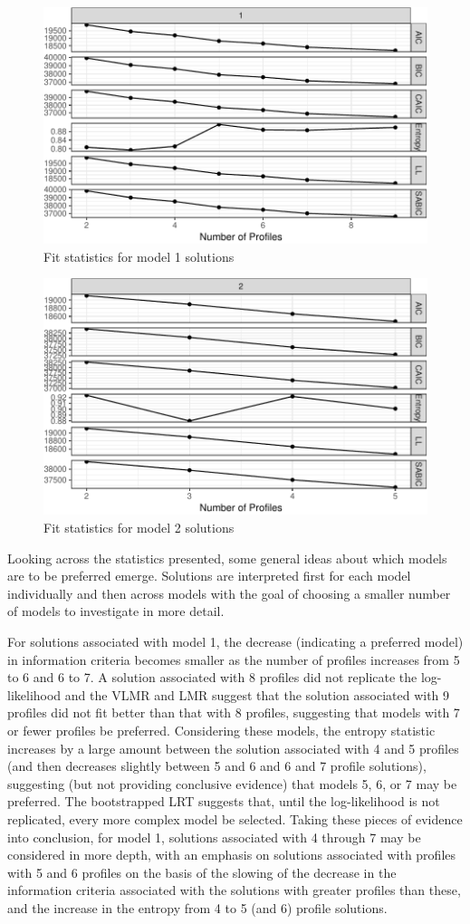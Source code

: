 \documentclass[]{book}
\theoremstyle{definition}
\theoremstyle{definition}
\theoremstyle{definition}
\theoremstyle{remark}
\begin{document}
\begin{figure}

{\centering \includegraphics[width=0.5\linewidth]{rosenberg-dissertation_files/figure-latex/model1-1} 

}

\caption{Fit statistics for model 1 solutions}\label{fig:model1}
\end{figure}

\begin{figure}

{\centering \includegraphics[width=0.4\linewidth]{rosenberg-dissertation_files/figure-latex/model2-1} 

}

\caption{Fit statistics for model 2 solutions}\label{fig:model2}
\end{figure}

Looking across the statistics presented, some general ideas about which
models are to be preferred emerge. Solutions are interpreted first for
each model individually and then across models with the goal of choosing
a smaller number of models to investigate in more detail.

For solutions associated with model 1, the decrease (indicating a
preferred model) in information criteria becomes smaller as the number
of profiles increases from 5 to 6 and 6 to 7. A solution associated with
8 profiles did not replicate the log-likelihood and the VLMR and LMR
suggest that the solution associated with 9 profiles did not fit better
than that with 8 profiles, suggesting that models with 7 or fewer
profiles be preferred. Considering these models, the entropy statistic
increases by a large amount between the solution associated with 4 and 5
profiles (and then decreases slightly between 5 and 6 and 6 and 7
profile solutions), suggesting (but not providing conclusive evidence)
that models 5, 6, or 7 may be preferred. The bootstrapped LRT suggests
that, until the log-likelihood is not replicated, every more complex
model be selected. Taking these pieces of evidence into conclusion, for
model 1, solutions associated with 4 through 7 may be considered in more
depth, with an emphasis on solutions associated with profiles with 5 and
6 profiles on the basis of the slowing of the decrease in the
information criteria associated with the solutions with greater profiles
than these, and the increase in the entropy from 4 to 5 (and 6) profile
solutions.
\end{document}
